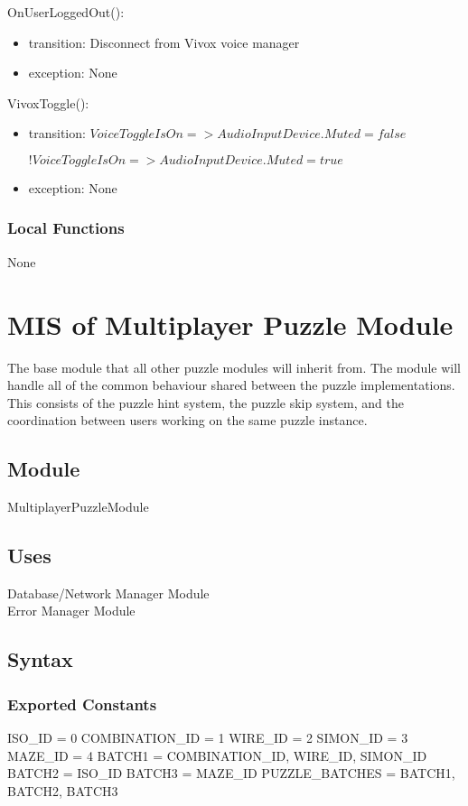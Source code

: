 \documentclass[12pt, titlepage]{article}
\begin{document}
\noindent OnUserLoggedOut():
\begin{itemize}
\item transition: Disconnect from Vivox voice manager
\item exception: None
\end{itemize}

\noindent VivoxToggle():
\begin{itemize}
\item transition: $VoiceToggleIsOn => AudioInputDevice.Muted = false$

$!VoiceToggleIsOn => AudioInputDevice.Muted = true$
\item exception: None
\end{itemize}

\subsubsection{Local Functions}

None

\newpage

\section{MIS of {Multiplayer Puzzle Module}} \label{sec:Puzzle} 

The base module that all other puzzle modules will inherit from. The module will handle all of the common behaviour shared between the puzzle implementations. This consists of the puzzle hint system, the puzzle skip system, and the coordination between users working on the same puzzle instance. 

\subsection{Module}
MultiplayerPuzzleModule

\subsection{Uses}
Database/Network Manager Module\\
Error Manager Module

\subsection{Syntax}

\subsubsection{Exported Constants}
ISO\_ID = 0\newline
COMBINATION\_ID = 1\newline
WIRE\_ID = 2\newline
SIMON\_ID = 3\newline
MAZE\_ID = 4\newline
BATCH1 = \textlangle COMBINATION\_ID, WIRE\_ID, SIMON\_ID\textrangle\newline
BATCH2 = \textlangle ISO\_ID\textrangle\newline
BATCH3 = \textlangle MAZE\_ID\textrangle\newline
PUZZLE\_BATCHES = \textlangle BATCH1, BATCH2, BATCH3\textrangle
\end{document}
